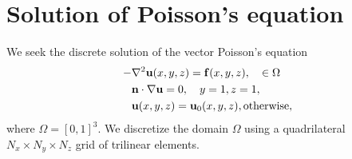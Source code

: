 \documentclass[unicode,11pt,a4paper,oneside,numbers=endperiod,openany]{scrartcl}
\def\u{{\bf u}}
\def\f{{\bf f}}
\def\n{{\bf n}}
\begin{document}
\setassignment
{}

\section*{Solution of Poisson's equation}
We seek the discrete solution of the vector Poisson's equation
\begin{align*}
-&\nabla^2 \u(x, y, z) = \f(x,y, z), \quad \in \Omega \\
&\n \cdot \nabla \u   = 0, \quad y=1, z=1,\\
&\u(x, y, z) = \u_0(x, y, z), \text{otherwise},
\end{align*}
where $\Omega = [0,1]^3$. We discretize the domain $\Omega$ using a quadrilateral $N_x \times N_y \times N_z$ grid of trilinear elements. 
\end{document}
